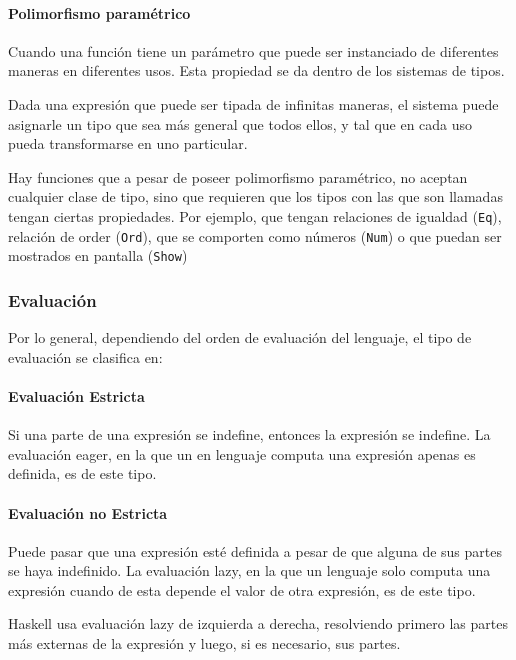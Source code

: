 \documentclass[10pt,a4paper]{article}
\begin{document}
\paragraph{Polimorfismo paramétrico} Cuando una función tiene un parámetro que puede ser instanciado de diferentes maneras en diferentes usos. Esta propiedad se da dentro de los sistemas de tipos.

Dada una expresión que puede ser tipada de infinitas maneras, el sistema puede asignarle un tipo que sea más general que todos ellos, y tal que en cada uso pueda transformarse en uno particular.

Hay funciones que a pesar de poseer polimorfismo paramétrico, no aceptan cualquier clase de tipo, sino que requieren que los tipos con las que son llamadas tengan ciertas propiedades. Por ejemplo, que tengan relaciones de igualdad (\texttt{Eq}), relación de order (\texttt{Ord}), que se comporten como números (\texttt{Num}) o que puedan ser mostrados en pantalla (\texttt{Show})

\subsubsection{Evaluación}
Por lo general, dependiendo del orden de evaluación del lenguaje, el tipo de evaluación se  clasifica en:

\paragraph{Evaluación Estricta} Si una parte de una expresión se indefine, entonces la expresión se indefine. La evaluación eager, en la que un en lenguaje computa una expresión apenas es definida, es de este tipo. 

\paragraph{Evaluación no Estricta} Puede pasar que una expresión esté definida a pesar de que alguna de sus partes se haya indefinido. La evaluación lazy, en la que un lenguaje solo computa una expresión cuando de esta depende el valor de otra expresión, es de este tipo.

Haskell usa evaluación lazy de izquierda a derecha, resolviendo primero las partes más externas de la expresión y luego, si es necesario, sus partes.
\end{document}
